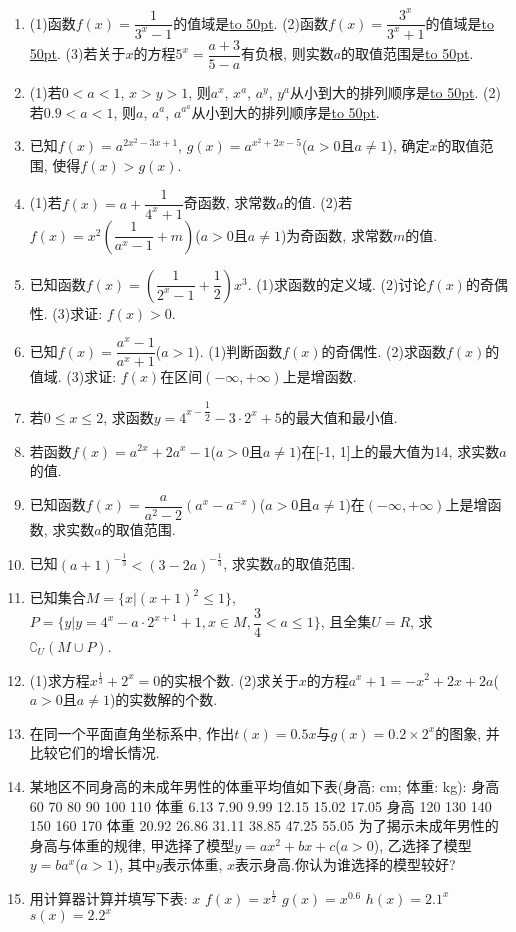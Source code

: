 \documentclass[10pt,a4paper]{article}
\newcommand{\blank}[1]{\underline{\hbox to #1pt{}}}
\begin{document}
\begin{enumerate}[1.]
\item (1)函数$f(x)=\dfrac 1{3^x-1}$的值域是\blank{50}.
(2)函数$f(x)=\dfrac{3^x}{3^x+1}$的值域是\blank{50}.
(3)若关于$x$的方程$5^x=\dfrac{a+3}{5-a}$有负根, 则实数$a$的取值范围是\blank{50}.
\item (1)若$0<a<1$, $x>y>1$, 则$a^x$, $x^a$, $a^y$, $y^a$从小到大的排列顺序是\blank{50}.
(2)若$0.9<a<1$, 则$a$, $a^a$, $a^{a^a}$从小到大的排列顺序是\blank{50}.
\item 已知$f(x)=a^{2x^2-3x+1}$, $g(x)=a^{x^2+2x-5}$($a>0$且$a\ne 1$), 确定$x$的取值范围, 使得$f(x)>g(x)$.
\item (1)若$f(x)=a+\dfrac 1{4^x+1}$奇函数, 求常数$a$的值.
(2)若$f(x)=x^2(\dfrac 1{a^x-1}+m)$($a>0$且$a\ne 1$)为奇函数, 求常数$m$的值.
\item 已知函数$f(x)=(\dfrac 1{2^x-1}+\dfrac 12)x^3$.
(1)求函数的定义域.
(2)讨论$f(x)$的奇偶性.
(3)求证: $f(x)>0$.
\item 已知$f(x)=\dfrac{a^x-1}{a^x+1}$($a>1$).
(1)判断函数$f(x)$的奇偶性.
(2)求函数$f(x)$的值域.
(3)求证: $f(x)$在区间$(-\infty ,+\infty)$上是增函数.
\item 若$0\le x\le 2$, 求函数$y=4^{x-\dfrac 12}-3\cdot 2^x+5$的最大值和最小值.
\item 若函数$f(x)=a^{2x}+2a^x-1$($a>0$且$a\ne 1$)在[-1, 1]上的最大值为14, 求实数$a$的值.
\item 已知函数$f(x)=\dfrac a{a^2-2}(a^x-a^{-x})$($a>0$且$a\ne 1$)在$(-\infty ,+\infty)$上是增函数, 求实数$a$的取值范围.
\item 已知$(a+1)^{-\frac 13}<(3-2a)^{-\frac 13}$, 求实数$a$的取值范围.
\item 已知集合$M=\{x|(x+1)^2\le 1\}$, $P=\{y|y=4^x-a\cdot 2^{x+1}+1,x\in M,\dfrac 34<a\le 1\}$, 且全集$U=R$, 求$\complement _U(M\cup P)$.
\item (1)求方程$x^{\frac 13}+2^x=0$的实根个数.
(2)求关于$x$的方程$a^x+1=-x^2+2x+2a$($a>0$且$a\ne 1$)的实数解的个数.
\item 在同一个平面直角坐标系中, 作出$t(x)=0.5x$与$g(x)=0.2\times 2^x$的图象, 并比较它们的增长情况.
\item 某地区不同身高的未成年男性的体重平均值如下表(身高: cm; 体重: kg):
身高	60	70	80	90	100	110
体重	6.13	7.90	9.99	12.15	15.02	17.05
身高	120	130	140	150	160	170
体重	20.92	26.86	31.11	38.85	47.25	55.05
为了揭示未成年男性的身高与体重的规律, 甲选择了模型$y=ax^2+bx+c$($a>0$), 乙选择了模型$y=ba^x$($a>1$), 其中$y$表示体重, $x$表示身高.你认为谁选择的模型较好?
\item 用计算器计算并填写下表:
$x$	$f(x)=x^{\frac 12}$	$g(x)=x^{0.6}$	$h(x)=2.1^x$	$s(x)=2.2^x$

\end{enumerate}
\end{document}
